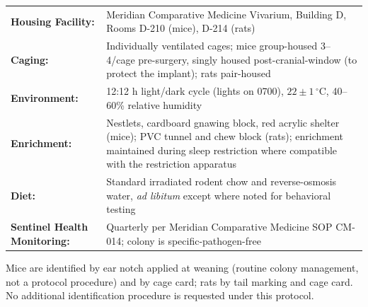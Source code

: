 \noindent
\begin{tabularx}{\linewidth}{@{} l X @{}}
\toprule
\textbf{Housing Facility:} & Meridian Comparative Medicine Vivarium, Building D, Rooms D-210 (mice), D-214 (rats) \\
\textbf{Caging:} & Individually ventilated cages; mice group-housed 3--4/cage pre-surgery, singly housed post-cranial-window (to protect the implant); rats pair-housed \\
\textbf{Environment:} & 12:12 h light/dark cycle (lights on 0700), $22 \pm 1\,^{\circ}\mathrm{C}$, 40--60\% relative humidity \\
\textbf{Enrichment:} & Nestlets, cardboard gnawing block, red acrylic shelter (mice); PVC tunnel and chew block (rats); enrichment maintained during sleep restriction where compatible with the restriction apparatus \\
\textbf{Diet:} & Standard irradiated rodent chow and reverse-osmosis water, \textit{ad libitum} except where noted for behavioral testing \\
\textbf{Sentinel Health Monitoring:} & Quarterly per Meridian Comparative Medicine SOP CM-014; colony is specific-pathogen-free \\
\bottomrule
\end{tabularx}

\vspace{6pt}

Mice are identified by ear notch applied at weaning (routine colony management, not a
protocol procedure) and by cage card; rats by tail marking and cage card. No additional
identification procedure is requested under this protocol.
